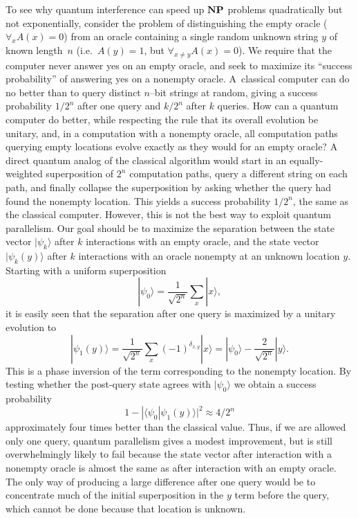 To see why quantum interference can speed up $\mbox{\bf NP}$ problems
quadratically but not exponentially, consider the problem of
distinguishing the empty oracle ($\forall_x A(x)\!=\!0$) from an oracle
containing a single random unknown string $y$ of known length~$n$
(i.e.~$A(y)\!=\!1$, but $\forall_{x\neq y} A(x)\!=\!0$).  We require that the
computer never answer yes on an empty oracle, and seek to maximize its
``success probability'' of answering yes on a
nonempty oracle.  A~classical computer can do no better than to query
distinct \mbox{$n$--bit} strings at random, giving a success probability
$1/2^n$ after one query and $k/2^n$ after $k$ queries.  How can a
quantum computer do better, while respecting the rule that its overall
evolution be unitary, and, in a computation with a nonempty oracle, all
computation paths querying empty locations evolve exactly as they would
for an empty oracle?  A direct quantum analog of the classical algorithm
would start in an equally-weighted superposition of $2^n$ computation
paths, query a different string on each path, and finally collapse the
superposition by asking whether the query had found the nonempty
location.  This yields a success probability $1/2^n$, the same as the
classical computer.  However, this is not the best way to exploit
quantum parallelism.  Our goal should be to maximize the separation
between the state vector $|\psi_k\rangle$ after $k$ interactions with an
empty oracle, and the state vector $|\psi_k(y)\rangle$ after $k$
interactions with an oracle nonempty at an unknown location $y$.
Starting with a uniform superposition
 \[
 |\psi_0\rangle=\frac{1}{\sqrt{2^n}}\sum_x |x\rangle,
 \]
it is easily seen that the separation after one query is maximized by a
unitary evolution to
 \[
 |\psi_1(y)\rangle
 = \frac{1}{\sqrt{2^n}}\sum_x (-1)^{\delta_{x,y}}|x\rangle
 = |\psi_0\rangle-\frac{2}{\sqrt{2^n}}|y\rangle .
 \]
This is a phase inversion of the term corresponding to the nonempty
location. By testing whether the post-query state agrees with
$|{\psi_0}\rangle$ we obtain a success probability
 \[ 1-|\langle\psi_0|\psi_1(y)\rangle|^2 \approx 4/2^n
 \] approximately four times better than the classical value.  Thus, if
we are allowed only one query, quantum parallelism gives a modest
improvement, but is still overwhelmingly likely to fail because the
state vector after interaction with a nonempty oracle is almost the same
as after interaction with an empty oracle. The only way of producing a
large difference after one query would be to concentrate much of the
initial superposition in the $y$ term before the query, which cannot
be done because that location is unknown.

